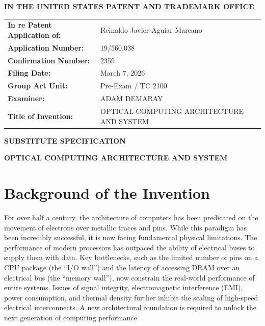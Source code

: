 \documentclass[11pt,letterpaper]{article}
\begin{document}
\thispagestyle{empty}

\begin{center}
    \large\textbf{IN THE UNITED STATES PATENT AND TRADEMARK OFFICE} \\
\end{center}

\vspace{0.2cm}
\noindent\begin{tabular}{p{2.3in}p{4.0in}}
\textbf{In re Patent Application of:} & Reinaldo Javier Aguiar Marcano \\
\textbf{Application Number:} & 19/560,038 \\
\textbf{Confirmation Number:} & 2359 \\
\textbf{Filing Date:} & March 7, 2026 \\
\textbf{Group Art Unit:} & Pre-Exam / TC 2100 \\
\textbf{Examiner:} & ADAM DEMARAY \\
\textbf{Title of Invention:} & OPTICAL COMPUTING ARCHITECTURE AND SYSTEM \\
\end{tabular}

\vspace{0.6cm}
\begin{center}
    \textbf{\large SUBSTITUTE SPECIFICATION}
\end{center}

\vspace{0.4cm}

\begin{center}
    \textbf{\large OPTICAL COMPUTING ARCHITECTURE AND SYSTEM}
\end{center}

\section*{Background of the Invention}
For over half a century, the architecture of computers has been predicated on the movement of electrons over metallic traces and pins. While this paradigm has been incredibly successful, it is now facing fundamental physical limitations. The performance of modern processors has outpaced the ability of electrical buses to supply them with data. Key bottlenecks, such as the limited number of pins on a CPU package (the ``I/O wall'') and the latency of accessing DRAM over an electrical bus (the ``memory wall''), now constrain the real-world performance of entire systems. Issues of signal integrity, electromagnetic interference (EMI), power consumption, and thermal density further inhibit the scaling of high-speed electrical interconnects. A new architectural foundation is required to unlock the next generation of computing performance.
\end{document}
